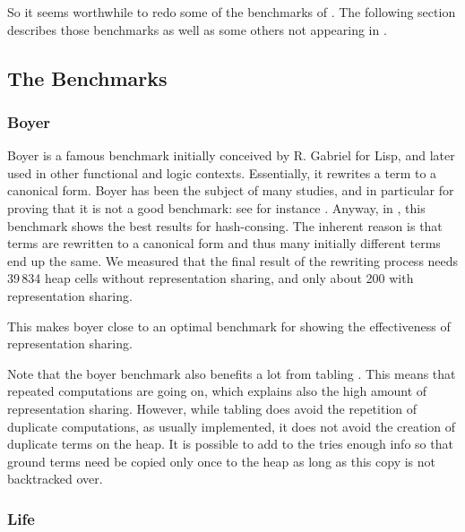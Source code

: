 \documentclass{tlp}
\begin{document}
So it seems worthwhile to redo some of the benchmarks of
\cite{appelhashconsinggc}. The following section describes those
benchmarks as well as some others not appearing in
\cite{appelhashconsinggc}.


\subsection{The Benchmarks}\label{benchmarks}


\subsubsection{Boyer}\label{boyer}

Boyer is a famous benchmark initially conceived by R. Gabriel for
Lisp, and later used in other functional and logic
contexts. Essentially, it rewrites a term to a canonical form. Boyer
has been the subject of many studies, and in particular for proving
that it is not a good benchmark: see for instance
\cite{bakerwarpspeed}. Anyway, in \cite{appelhashconsinggc}, this
benchmark shows the best results for hash-consing. The inherent
reason is that terms are rewritten to a canonical form and thus
many initially different terms end up the same. We measured that the
final result of the rewriting process needs 39\,834 heap cells without
representation sharing, and only about 200 with representation
sharing.

This makes boyer close to an optimal benchmark for showing the
effectiveness of representation sharing.

Note that the boyer benchmark also benefits a lot from tabling
\cite{ChWa96}. This means that repeated computations are going on,
which explains also the high amount of representation
sharing. However, while tabling does avoid the repetition of duplicate
computations, as usually implemented, it does not avoid the creation
of duplicate terms on the heap. It is possible to add to the tries
enough info so that ground terms need be copied only once to the heap
as long as this copy is not backtracked over.


\subsubsection{Life}\label{life}
\end{document}
